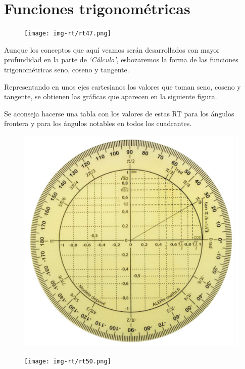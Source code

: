 \vspace{1cm}
\section{Funciones trigonométricas}
\vspace{0.5cm}

\begin{figure}[H]
	\centering
	\texttt{[image: img-rt/rt47.png]}
\end{figure}


\begin{multicols}{2}
Aunque los conceptos que aquí veamos serán desarrollados con mayor profundidad en la parte de \emph{`Cálculo'}, esbozaremos la forma de las funciones trigonométricas seno, coseno y tangente.

Representando en unos ejes cartesianos los valores que toman seno, coseno y tangente, se obtienen las gráficas que aparecen en la siguiente figura.

Se aconseja hacerse una tabla con los valores de estas RT para los ángulos frontera y para los ángulos notables en todos los cuadrantes. 

\begin{figure}[H]
	\centering
	\includegraphics[width=.45\textwidth]{img-rt/rt26.png}
\end{figure}
\end{multicols}

\begin{figure}[H]
	\centering
	\texttt{[image: img-rt/rt50.png]}
\end{figure}

